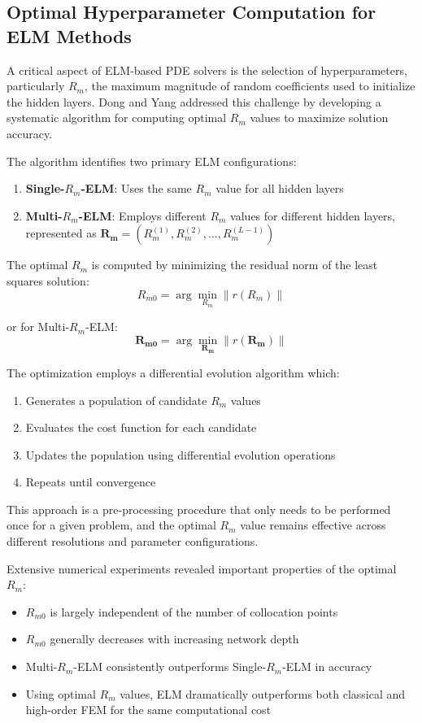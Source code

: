 \documentclass[11pt]{article}
\begin{document}
\subsection{Optimal Hyperparameter Computation for ELM Methods}

A critical aspect of ELM-based PDE solvers is the selection of hyperparameters, particularly $R_m$, the maximum magnitude of random coefficients used to initialize the hidden layers. Dong and Yang \citep{Dong2021b} addressed this challenge by developing a systematic algorithm for computing optimal $R_m$ values to maximize solution accuracy.

The algorithm identifies two primary ELM configurations:
\begin{enumerate}
    \item \textbf{Single-$R_m$-ELM}: Uses the same $R_m$ value for all hidden layers
    \item \textbf{Multi-$R_m$-ELM}: Employs different $R_m$ values for different hidden layers, represented as $\mathbf{R_m} = (R_m^{(1)}, R_m^{(2)}, ..., R_m^{(L-1)})$
\end{enumerate}

The optimal $R_m$ is computed by minimizing the residual norm of the least squares solution:
\begin{equation}
    R_{m0} = \arg\min_{R_m} \|r(R_m)\|
\end{equation}

or for Multi-$R_m$-ELM:
\begin{equation}
    \mathbf{R_{m0}} = \arg\min_{\mathbf{R_m}} \|r(\mathbf{R_m})\|
\end{equation}

The optimization employs a differential evolution algorithm which:
\begin{enumerate}
    \item Generates a population of candidate $R_m$ values
    \item Evaluates the cost function for each candidate
    \item Updates the population using differential evolution operations
    \item Repeats until convergence
\end{enumerate}

This approach is a pre-processing procedure that only needs to be performed once for a given problem, and the optimal $R_m$ value remains effective across different resolutions and parameter configurations.

Extensive numerical experiments revealed important properties of the optimal $R_m$:
\begin{itemize}
    \item $R_{m0}$ is largely independent of the number of collocation points
    \item $R_{m0}$ generally decreases with increasing network depth
    \item Multi-$R_m$-ELM consistently outperforms Single-$R_m$-ELM in accuracy
    \item Using optimal $R_m$ values, ELM dramatically outperforms both classical and high-order FEM for the same computational cost
\end{itemize}
\end{document}
